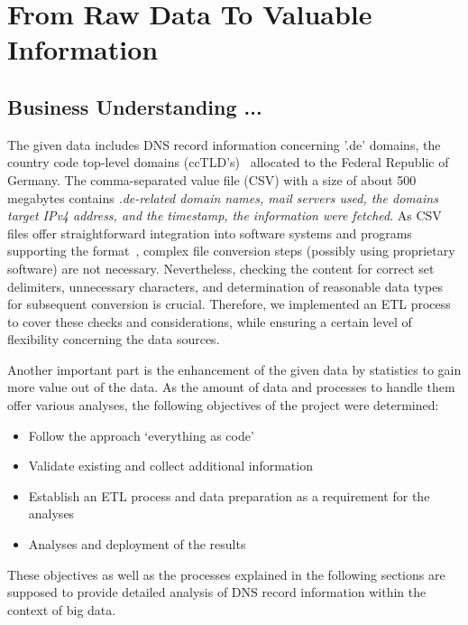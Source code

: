 \section{From Raw Data To Valuable Information}\label{sec:from-raw-data-to-valuable-information}

\subsection{Business Understanding ...}\label{subsec:businessunderstanding}
The given data includes DNS record information concerning '.de' domains, the country code top-level domains (ccTLD's)~\autocite[cf.][]{DENICeG.2021} allocated to the Federal Republic of Germany.
The comma-separated value file (CSV) with a size of about 500 megabytes contains \textit{.de-related domain names, mail servers used, the domains target IPv4 address, and the timestamp, the information were fetched}.
As CSV files offer straightforward integration into software systems and programs supporting the format~\autocite[cf.][]{Hoffman.2018}, complex file conversion steps (possibly using proprietary software) are not necessary.
Nevertheless, checking the content for correct set delimiters, unnecessary characters, and determination of reasonable data types for subsequent conversion is crucial.
Therefore, we implemented an ETL process to cover these checks and considerations, while ensuring a certain level of flexibility concerning the data sources.

Another important part is the enhancement of the given data by statistics to gain more value out of the data.
As the amount of data and processes to handle them offer various analyses, the following objectives of the project were determined:
\begin{itemize}
    \item Follow the approach ‘everything as code’
    \item Validate existing and collect additional information
    \item Establish an ETL process and data preparation as a requirement for the analyses
    \item Analyses and deployment of the results
\end{itemize}
These objectives as well as the processes explained in the following sections are supposed to provide detailed analysis of DNS record information within the context of big data.



